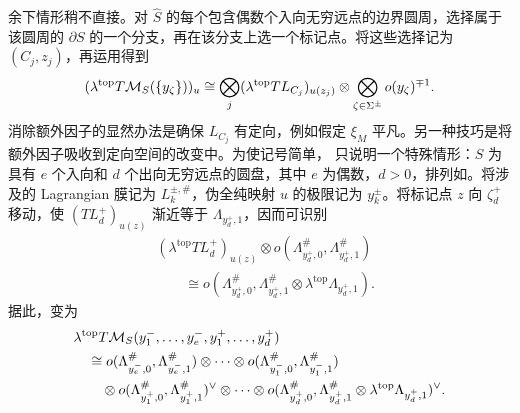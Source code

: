 余下情形稍不直接。对 $\hat S$ 的每个包含偶数个入向无穷远点的边界圆周，选择属于该圆周的 $\partial S$ 的一个分支，再在该分支上选一个标记点。将这些选择记为 $(C_j,\allowbreak z_j)$，再运用得到
\begin{equation}\label{eq:12.5}
(\lambda^{\mathrm{top}}T\mathcal M_S(\{y_\zeta\}))_u
\cong\bigotimes_j(\lambda^{\mathrm{top}}TL_{C_j})_{u(z_j)}\otimes\bigotimes_{\zeta\in\Sigma^\pm}o(y_\zeta)^{\mp1}.
\end{equation}
消除额外因子的显然办法是确保 $L_{C_j}$ 有定向，例如假定 $\xi_M$ 平凡。另一种技巧是将额外因子吸收到定向空间的改变中。为使记号简单，
只说明一个特殊情形：$S$ 为具有 $e$ 个入向和 $d$ 个出向无穷远点的圆盘，其中 $e$ 为偶数，$d>0$，排列如。将涉及的 Lagrangian 膜记为 $L_k^{\pm,\allowbreak \#}$，伪全纯映射 $u$ 的极限记为 $y_k^\pm$。将标记点 $z$ 向 $\zeta_d^+$ 移动，使 $(TL_d^+)_{u(z)}$ 渐近等于 $\Lambda_{y_d^+,\allowbreak 1}$，因而可识别
\begin{equation}\label{eq:12.6}
\begin{aligned}
&(\lambda^{\mathrm{top}}TL_d^+)_{u(z)}\otimes o(\Lambda_{y_d^+,0}^\#,\Lambda_{y_d^+,1}^\#)\\
&\qquad\cong o(\Lambda_{y_d^+,0}^\#,\Lambda_{y_d^+,1}^\#\otimes\lambda^{\mathrm{top}}\Lambda_{y_d^+,1}).
\end{aligned}
\end{equation}
据此，变为
\begin{equation}\label{eq:12.7}
\begin{aligned}
&\lambda^{\mathrm{top}}T\mathcal M_S(y_1^-,\ldots,y_e^-,y_1^+,\ldots,y_d^+)\\
&\quad\cong o(\Lambda_{y_e^-,0}^\#,\Lambda_{y_e^-,1}^\#)\otimes\cdots\otimes o(\Lambda_{y_1^-,0}^\#,\Lambda_{y_1^-,1}^\#)\\
&\qquad\otimes o(\Lambda_{y_1^+,0}^\#,\Lambda_{y_1^+,1}^\#)^\vee\otimes\cdots
\otimes o(\Lambda_{y_d^+,0}^\#,\Lambda_{y_d^+,1}^\#\otimes\lambda^{\mathrm{top}}\Lambda_{y_d^+,1})^\vee.
\end{aligned}
\end{equation}

